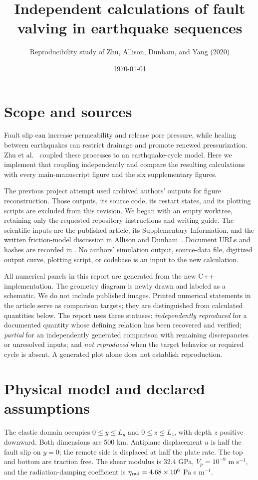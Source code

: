 \documentclass[11pt]{article}
\title{Independent calculations of fault valving in earthquake sequences}
\author{Reproducibility study of Zhu, Allison, Dunham, and Yang (2020)}
\date{\today}
\newcommand{\code}[1]{\texttt{\detokenize{#1}}}
\begin{document}
\maketitle


\section{Scope and sources}
Fault slip can increase permeability and release pore pressure, while healing
between earthquakes can restrict drainage and promote renewed pressurization.
Zhu et al.\ \cite{zhu} coupled these processes to an earthquake-cycle model.
Here we implement that coupling independently and compare the resulting
calculations with every main-manuscript figure and the six supplementary figures.

The previous project attempt used archived authors' outputs for figure
reconstruction. Those outputs, its source code, its restart states, and its
plotting scripts are excluded from this revision. We began with an empty
worktree, retaining only the requested repository instructions and writing guide.
The scientific inputs are the published article, its Supplementary Information,
and the written friction-model discussion in Allison and Dunham\ \cite{allison}.
Document URLs and hashes are recorded in \code{documentation/sources.json}.
No authors' simulation output, source-data file, digitized output curve, plotting
script, or codebase is an input to the new calculation.

All numerical panels in this report are generated from the new C++ implementation.
The geometry diagram is newly drawn and labeled as a schematic. We do not
include published images. Printed numerical statements in the article serve as
comparison targets; they are distinguished from calculated quantities below.
The report uses three statuses: \emph{independently reproduced} for a documented
quantity whose defining relation has been recovered and verified;
\emph{partial} for an independently generated comparison with remaining
discrepancies or unresolved inputs; and \emph{not reproduced} when the target
behavior or required cycle is absent. A generated plot alone does not establish
reproduction.

\section{Physical model and declared assumptions}
The elastic domain occupies $0\leq y\leq L_y$ and $0\leq z\leq L_z$, with depth
$z$ positive downward. Both dimensions are 500 km. Antiplane displacement $u$
is half the fault slip on $y=0$; the remote side is displaced at half the plate
rate. The top and bottom are traction free. The shear modulus is 32.4 GPa,
$V_p=10^{-9}$ m s$^{-1}$, and the radiation-damping coefficient is
$\eta_{\rm rad}=4.68\times10^6$ Pa s m$^{-1}$.
\end{document}

